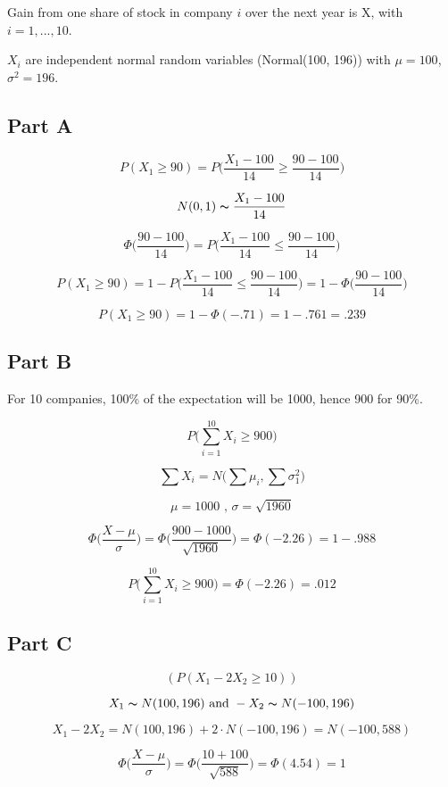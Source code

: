 \documentclass[letterpaper]{article}
\begin{document}
Gain from one share of stock in company $i$ over the next year is X, with $i = 1,...,10$.

\noindent $X_i$ are independent normal random variables (Normal(100, 196)) with $\mu = 100$, $\sigma^2 = 196$.

\subsection*{Part A}

$$P(X_1 \geq 90) = P \Big( \frac{X_1 - 100}{14} \geq \frac{90 - 100}{14} \Big)$$

$$N(0, 1) \thicksim \frac{X_1 - 100}{14}$$

$$\Phi \Big( \frac{90 - 100}{14} \Big) = P \Big( \frac{X_1 - 100}{14} \leq \frac{90 - 100}{14} \Big)$$

$$P(X_1 \geq 90) = 1 - P \Big( \frac{X_1 - 100}{14} \leq \frac{90 - 100}{14} \Big) = 1 - \Phi \Big( \frac{90 - 100}{14} \Big)$$

$$P(X_1 \geq 90) = 1 - \Phi(-.71) = 1 - .761 = .239$$

\subsection*{Part B}

For 10 companies, 100\% of the expectation will be 1000, hence 900 for 90\%.

$$P \Big( \sum_{i=1}^{10} X_i \geq  900 \Big)$$

$$\sum X_i = N \Big( \sum \mu_i, \sum \sigma_1^2\Big) $$

$$\mu = 1000 \text{ , } \sigma = \sqrt{1960} $$

$$\Phi \Big( \frac{X - \mu}{\sigma} \Big) = \Phi \Big( \frac{900 - 1000}{\sqrt{1960}} \Big) = \Phi (-2.26) = 1 - .988$$

$$P \Big( \sum_{i=1}^{10} X_i \geq  900 \Big) = \Phi(-2.26) = .012$$

\subsection*{Part C}

$$(P(X_1 - 2X_2 \geq 10))$$

$$X_1 \thicksim N(100, 196) \text{ and } -X_2 \thicksim N(-100, 196)$$

$$X_1 - 2X_2 = N(100, 196) + 2 \cdot N(-100, 196) = N(-100, 588)$$

$$\Phi \Big( \frac{X - \mu}{\sigma} \Big) = \Phi \Big( \frac{10 + 100}{\sqrt{588}} \Big) = \Phi (4.54) = 1$$
\end{document}
